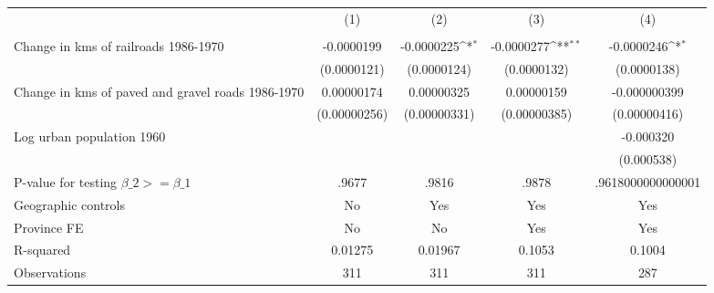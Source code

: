 {
\def\sym#1{\ifmmode^{#1}\else\(^{#1}\)\fi}
\begin{tabular}{l*{4}{c}}
\hline\hline
                &\multicolumn{1}{c}{(1)}&\multicolumn{1}{c}{(2)}&\multicolumn{1}{c}{(3)}&\multicolumn{1}{c}{(4)}\\
                &\multicolumn{1}{c}{}&\multicolumn{1}{c}{}&\multicolumn{1}{c}{}&\multicolumn{1}{c}{}\\
\hline
Change in kms of railroads 1986-1970&-0.0000199         &-0.0000225\sym{*}  &-0.0000277\sym{**} &-0.0000246\sym{*}  \\
                &(0.0000121)         &(0.0000124)         &(0.0000132)         &(0.0000138)         \\
[1em]
Change in kms of paved and gravel roads 1986-1970&0.00000174         &0.00000325         &0.00000159         &-0.000000399         \\
                &(0.00000256)         &(0.00000331)         &(0.00000385)         &(0.00000416)         \\
[1em]
Log urban population 1960&                  &                  &                  &-0.000320         \\
                &                  &                  &                  &(0.000538)         \\
\hline
P-value for testing $\beta\_{2} >= \beta\_{1}$&    .9677         &    .9816         &    .9878         &.9618000000000001         \\
Geographic controls&       No         &      Yes         &      Yes         &      Yes         \\
Province FE     &       No         &       No         &      Yes         &      Yes         \\
R-squared       &  0.01275         &  0.01967         &   0.1053         &   0.1004         \\
Observations    &      311         &      311         &      311         &      287         \\
\hline\hline
\end{tabular}
}
